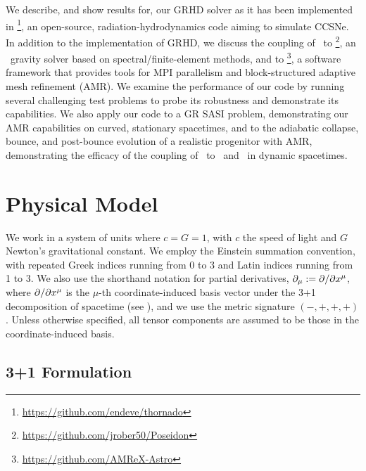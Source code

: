 We describe, and show results for, our GRHD solver
as it has been implemented in \thornado%
\footnote{\url{https://github.com/endeve/thornado}},
an open-source, radiation-hydrodynamics code aiming to simulate CCSNe.
In addition to the implementation of GRHD, we discuss the coupling
of \thornado\ to \poseidon%
\footnote{\url{https://github.com/jrober50/Poseidon}},
an \xcfc\ gravity solver based on spectral/finite-element methods,
and to \amrex\footnote{\url{https://github.com/AMReX-Astro}},
a software framework that provides tools for MPI parallelism
and block-structured adaptive mesh refinement (AMR).
We examine the performance of our code by running several challenging test
problems to probe its robustness and demonstrate its capabilities.
We also apply our code to a GR SASI problem, demonstrating
our AMR capabilities on curved, stationary spacetimes,
and to the adiabatic collapse, bounce, and post-bounce evolution of a realistic
progenitor with AMR,
demonstrating the efficacy of the coupling of
\thornado\ to \poseidon\ and \amrex\ in dynamic spacetimes.


\section{Physical Model}

We work in a system of units where $c=G=1$,
with $c$ the speed of light and $G$ Newton's gravitational constant.
We employ the Einstein summation convention,
with repeated Greek indices running from
0 to 3 and Latin indices running from 1 to 3.
We also use the shorthand notation for partial derivatives,
$\partial_{\mu}:=\partial/\partial x^{\mu}$, where $\partial/\partial x^{\mu}$
is the $\mu$-th coordinate-induced basis vector under the 3+1 decomposition
of spacetime (see ),
and we use the metric signature $\left(-,+,+,+\right)$.
Unless otherwise specified, all tensor components are assumed to be those
in the coordinate-induced basis.

\subsection{3+1 Formulation}
\label{ss.3+1}


